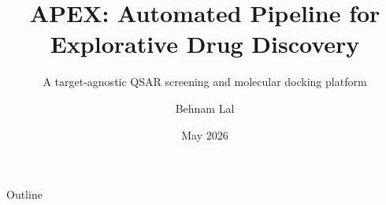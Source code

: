 \documentclass[aspectratio=169]{beamer}
\title[APEX]{APEX: Automated Pipeline for Explorative Drug Discovery}
\subtitle{A target-agnostic QSAR screening and molecular docking platform}
\author{Behnam Lal}
\institute{Computational Drug Discovery}
\date{May 2026}
\begin{document}
\frame{\titlepage}

\begin{frame}{Outline}
  \tableofcontents
\end{frame}








\end{document}
